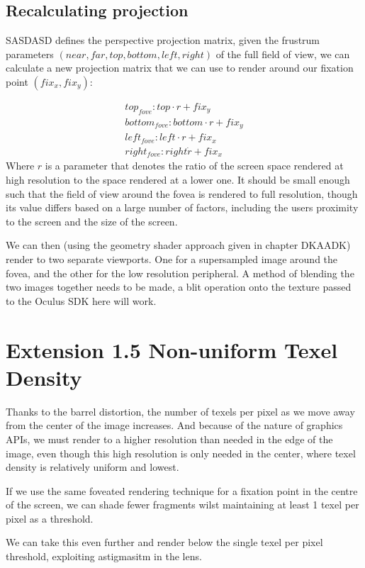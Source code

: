 \documentclass[12pt,a4paper,twoside,openright]{report}
\begin{document}
\subsection{Recalculating projection}

SASDASD defines the perspective projection matrix, given the frustrum parameters $(near, far, top, bottom, left, right)$ of the full field of view, we can calculate a new projection matrix that we can use to render around our fixation point $(fix_x, fix_y)$:

\[
\begin{matrix}
top_{fove}: top \cdot r + fix_y \\
bottom_{fove}: bottom \cdot r + fix_y \\
left_{fove}: left \cdot r + fix_x \\
right_{fove}: right \dot r + fix_x 
\end{matrix}
\]
Where $r$ is a parameter that denotes the ratio of the screen space rendered at high resolution to the space rendered at a lower one. It should be small enough such that the field of view around the fovea is rendered to full resolution, though its value differs based on a large number of factors, including the users proximity to the screen and the size of the screen.

We can then (using the geometry shader approach given in chapter DKAADK) render to two separate viewports. One for a supersampled image around the fovea, and the other for the low resolution peripheral. A method of blending the two images together needs to be made, a blit operation onto the texture passed to the Oculus SDK here will work. 

\section{Extension 1.5 Non-uniform Texel Density}

Thanks to the barrel distortion, the number of texels per pixel as we move away from the center of the image increases. And because of the nature of graphics APIs, we must render to a higher resolution than needed in the edge of the image, even though this high resolution is only needed in the center, where texel density is relatively uniform and lowest.

If we use the same foveated rendering technique for a fixation point in the centre of the screen, we can shade fewer fragments wilst maintaining at least 1 texel per pixel as a threshold.

We can take this even further and render below the single texel per pixel threshold, exploiting astigmasitm in the lens.
\end{document}
